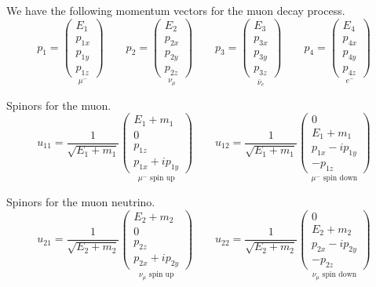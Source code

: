 We have the following momentum vectors for the muon decay process.
\begin{equation*}
p_1=\underset{\mu^-}
{\begin{pmatrix}E_1\\p_{1x}\\p_{1y}\\p_{1z}\end{pmatrix}}
\qquad
p_2=\underset{\nu_\mu}
{\begin{pmatrix}E_2\\p_{2x}\\p_{2y}\\p_{2z}\end{pmatrix}}
\qquad
p_3=\underset{\bar\nu_e}
{\begin{pmatrix}E_3\\p_{3x}\\p_{3y}\\p_{3z}\end{pmatrix}}
\qquad
p_4=\underset{e^-}
{\begin{pmatrix}E_4\\p_{4x}\\p_{4y}\\p_{4z}\end{pmatrix}}
\end{equation*}

Spinors for the muon.
\begin{equation*}
u_{11}=\frac{1}{\sqrt{E_1+m_1}}
\underset{\text{$\mu^-$ spin up}}
{\begin{pmatrix}E_1+m_1\\0\\p_{1z}\\p_{1x}+ip_{1y}\end{pmatrix}}
\qquad
u_{12}=\frac{1}{\sqrt{E_1+m_1}}
\underset{\text{$\mu^-$ spin down}}
{\begin{pmatrix}0\\E_1+m_1\\p_{1x}-ip_{1y}\\-p_{1z}\end{pmatrix}}
\end{equation*}

Spinors for the muon neutrino.
\begin{equation*}
u_{21}=\frac{1}{\sqrt{E_2+m_2}}
\underset{\text{$\nu_\mu$ spin up}}
{\begin{pmatrix}E_2+m_2\\0\\p_{2z}\\p_{2x}+ip_{2y}\end{pmatrix}}
\qquad
u_{22}=\frac{1}{\sqrt{E_2+m_2}}
\underset{\text{$\nu_\mu$ spin down}}
{\begin{pmatrix}0\\E_2+m_2\\p_{2x}-ip_{2y}\\-p_{2z}\end{pmatrix}}
\end{equation*}

